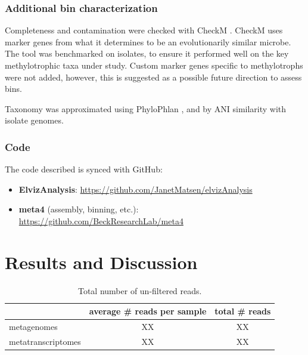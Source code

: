 \subsubsection{Additional bin characterization}

Completeness and contamination were checked with CheckM \cite{parks2015}.
CheckM uses marker genes from what it determines to be an evolutionarily similar microbe.
The tool was benchmarked on isolates, to ensure it performed well on the key methylotrophic taxa under study.
Custom marker genes specific to methylotrophs were not added, however, this is suggested as a possible future direction to assess bins.

Taxonomy was approximated using PhyloPhlan \cite{segata2013}, and by ANI similarity with isolate genomes.

\subsubsection{Code}
The code described is synced with GitHub:
\begin{itemize}
    \item \textbf{ElvizAnalysis}: \url{https://github.com/JanetMatsen/elvizAnalysis}
    \item \textbf{meta4} (assembly, binning, etc.): \url{https://github.com/BeckResearchLab/meta4}
\end{itemize}

\section{Results and Discussion}


\begin{table}[H]
\centering
\begin{tabular}{l | cc}
        & average \# reads per sample & total \# reads \\
\midrule
	metagenomes & XX & XX \\
	metatranscriptomes & XX & XX \\
\end{tabular}
\caption{Total number of un-filtered reads.}
\label{table:sample_read_sizes}
\end{table}

